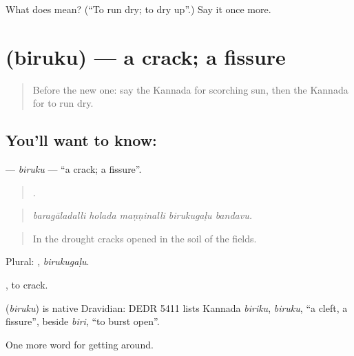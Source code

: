 \begin{tcolorbox}[breakable,colback=teal!4,colframe=teal!35!black,title={Before you move on}]
What does  mean? (\textquotedblleft{}To run dry; to dry up\textquotedblright{}.) Say it once more.
\end{tcolorbox}
\section[\texorpdfstring{\kn{ಬಿರುಕು} (biruku)}{ಬಿರುಕು (biruku)}]{ (biruku) — a crack; a fissure}

\label{lesson:KA-C488-biruku}



\begin{quote}
Before the new one: say the Kannada for scorching sun, then the Kannada for to run dry.
\end{quote}

\subsection*{You'll want to know: }
\textbf{} — \emph{biruku} — \textquotedblleft{}a crack; a fissure\textquotedblright{}.

\begin{quote}
    .
\end{quote}

\begin{quote}
\emph{baragāladalli holada maṇṇinalli birukugaḷu bandavu.}
\end{quote}

\begin{quote}
In the drought cracks opened in the soil of the fields.
\end{quote}

Plural: , \emph{birukugaḷu}.

 , to crack.

\begin{cousinweb}
\textbf{} (\emph{biruku}) is native Dravidian: DEDR 5411 lists Kannada \emph{biriku}, \emph{biruku}, \textquotedblleft{}a cleft, a fissure\textquotedblright{}, beside \emph{biri}, \textquotedblleft{}to burst open\textquotedblright{}.
\end{cousinweb}

\begin{grammarlens}[title={What you've built}]
One more word for getting around.
\end{grammarlens}


